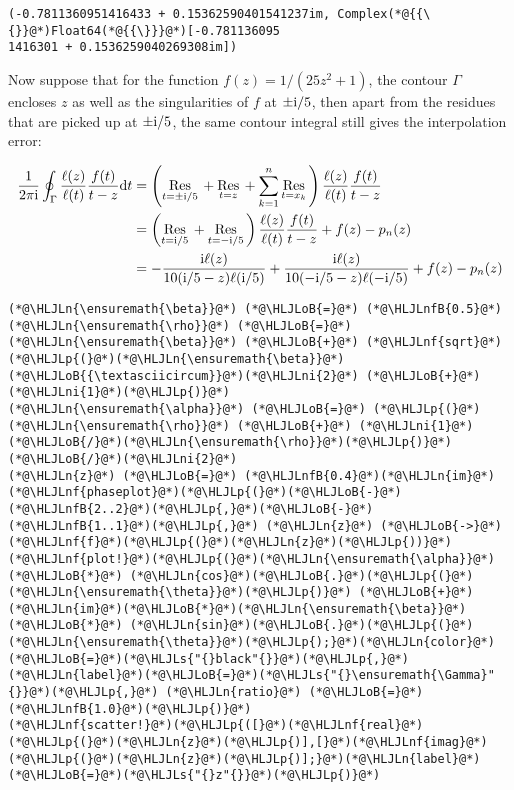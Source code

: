 \documentclass[12pt,a4paper]{article}
\newcommand{\HLJLn}[1]{#1}
\newcommand{\HLJLnf}[1]{\textcolor[RGB]{66,102,213}{#1}}
\newcommand{\HLJLs}[1]{\textcolor[RGB]{201,61,57}{#1}}
\newcommand{\HLJLnfB}[1]{\textcolor[RGB]{59,151,46}{#1}}
\newcommand{\HLJLni}[1]{\textcolor[RGB]{59,151,46}{#1}}
\newcommand{\HLJLoB}[1]{\textcolor[RGB]{102,102,102}{\textbf{#1}}}
\newcommand{\HLJLp}[1]{#1}
\def\D{ {\rm d} }
\def\I{ {\rm i} }
\def\Res_#1{\underset{#1}{\rm Res}\,}
\def\dt{\D t}
\begin{document}
\begin{lstlisting}
(-0.7811360951416433 + 0.15362590401541237im, Complex(*@{{\{}}@*)Float64(*@{{\}}}@*)[-0.781136095
1416301 + 0.1536259040269308im])
\end{lstlisting}


Now suppose that for the function $f(z) = 1/(25z^2 + 1)$, the contour $\Gamma$ encloses $z$ as well as the singularities of $f$ at $\pm\I/5$, then apart from the residues that are picked up at $\pm \I/5$, the same contour integral still gives the interpolation error:


\begin{align*}
{1 \over 2\pi\I}\oint_{\Gamma} {\ell(z) \over \ell(t)}{f(t) \over t - z}\dt &= \left(\Res_{t = \pm\I/5} +\Res_{t = z} + \sum_{k = 1}^{n} \Res_{t = x_k}  \right) {\ell(z) \over \ell(t)}{f(t) \over t - z} \\
 &= \left(\Res_{t = \I/5} +\Res_{t = -\I/5}  \right) {\ell(z) \over \ell(t)}{f(t) \over t - z} + f(z) - p_n(z) \\
& =  -\frac{\I\ell(z)}{10(\I/5 - z)\ell(\I/5)} +  \frac{\I\ell(z)}{10(-\I/5 - z)\ell(-\I/5)} + f(z) - p_n(z)
\end{align*}

\begin{lstlisting}
(*@\HLJLn{\ensuremath{\beta}}@*) (*@\HLJLoB{=}@*) (*@\HLJLnfB{0.5}@*)
(*@\HLJLn{\ensuremath{\rho}}@*) (*@\HLJLoB{=}@*) (*@\HLJLn{\ensuremath{\beta}}@*) (*@\HLJLoB{+}@*) (*@\HLJLnf{sqrt}@*)(*@\HLJLp{(}@*)(*@\HLJLn{\ensuremath{\beta}}@*)(*@\HLJLoB{{\textasciicircum}}@*)(*@\HLJLni{2}@*) (*@\HLJLoB{+}@*) (*@\HLJLni{1}@*)(*@\HLJLp{)}@*)
(*@\HLJLn{\ensuremath{\alpha}}@*) (*@\HLJLoB{=}@*) (*@\HLJLp{(}@*)(*@\HLJLn{\ensuremath{\rho}}@*) (*@\HLJLoB{+}@*) (*@\HLJLni{1}@*)(*@\HLJLoB{/}@*)(*@\HLJLn{\ensuremath{\rho}}@*)(*@\HLJLp{)}@*)(*@\HLJLoB{/}@*)(*@\HLJLni{2}@*)
(*@\HLJLn{z}@*) (*@\HLJLoB{=}@*) (*@\HLJLnfB{0.4}@*)(*@\HLJLn{im}@*)
(*@\HLJLnf{phaseplot}@*)(*@\HLJLp{(}@*)(*@\HLJLoB{-}@*)(*@\HLJLnfB{2..2}@*)(*@\HLJLp{,}@*)(*@\HLJLoB{-}@*)(*@\HLJLnfB{1..1}@*)(*@\HLJLp{,}@*) (*@\HLJLn{z}@*) (*@\HLJLoB{->}@*) (*@\HLJLnf{f}@*)(*@\HLJLp{(}@*)(*@\HLJLn{z}@*)(*@\HLJLp{))}@*)
(*@\HLJLnf{plot!}@*)(*@\HLJLp{(}@*)(*@\HLJLn{\ensuremath{\alpha}}@*) (*@\HLJLoB{*}@*) (*@\HLJLn{cos}@*)(*@\HLJLoB{.}@*)(*@\HLJLp{(}@*)(*@\HLJLn{\ensuremath{\theta}}@*)(*@\HLJLp{)}@*) (*@\HLJLoB{+}@*) (*@\HLJLn{im}@*)(*@\HLJLoB{*}@*)(*@\HLJLn{\ensuremath{\beta}}@*) (*@\HLJLoB{*}@*) (*@\HLJLn{sin}@*)(*@\HLJLoB{.}@*)(*@\HLJLp{(}@*)(*@\HLJLn{\ensuremath{\theta}}@*)(*@\HLJLp{);}@*)(*@\HLJLn{color}@*)(*@\HLJLoB{=}@*)(*@\HLJLs{"{}black"{}}@*)(*@\HLJLp{,}@*) (*@\HLJLn{label}@*)(*@\HLJLoB{=}@*)(*@\HLJLs{"{}\ensuremath{\Gamma}"{}}@*)(*@\HLJLp{,}@*) (*@\HLJLn{ratio}@*) (*@\HLJLoB{=}@*) (*@\HLJLnfB{1.0}@*)(*@\HLJLp{)}@*)
(*@\HLJLnf{scatter!}@*)(*@\HLJLp{([}@*)(*@\HLJLnf{real}@*)(*@\HLJLp{(}@*)(*@\HLJLn{z}@*)(*@\HLJLp{)],[}@*)(*@\HLJLnf{imag}@*)(*@\HLJLp{(}@*)(*@\HLJLn{z}@*)(*@\HLJLp{)];}@*)(*@\HLJLn{label}@*)(*@\HLJLoB{=}@*)(*@\HLJLs{"{}z"{}}@*)(*@\HLJLp{)}@*)
\end{lstlisting}
\end{document}
